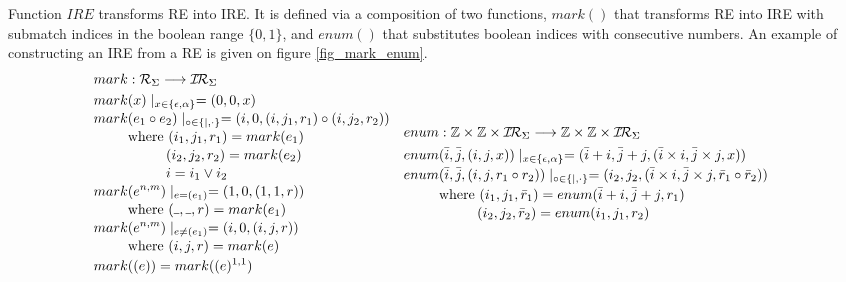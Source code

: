 \documentclass[AMA,STIX1COL]{WileyNJD-v2}
\newcommand{\Xund}{\rule{.4em}{.4pt}}
\newcommand{\XI}{\mathcal{I}}
\newcommand{\XIR}{\XI\!\XR}
\newcommand{\XR}{\mathcal{R}}
\newcommand{\YZ}{\mathbb{Z}}
\newcommand{\IRE}{I\!RE}
\begin{document}
Function $\IRE$ transforms RE into IRE.
It is defined via a composition of two functions,
$mark()$ that transforms RE into IRE with submatch indices in the boolean range $\{0, 1\}$,
and $enum()$ that substitutes boolean indices with consecutive numbers.
An example of constructing an IRE from a RE is given on figure \ref{fig_mark_enum}.
%
    \begin{align*}
    &\begin{aligned}
        mark &: \XR_\Sigma \longrightarrow \XIR_\Sigma \\
        mark &(x) \mid_{x \in \{\epsilon, \alpha\}} = (0, 0, x) \\[-0.2em]
        mark &(e_1 \circ e_2) \mid_{\circ \in \{|,\cdot\}} = (i, 0,
            (i, j_1, r_1) \circ
            (i, j_2, r_2)
            ) \\[-0.2em]
            &\text{where }            (i_1, j_1, r_1) = mark(e_1) \\[-0.2em]
            &\space{\hphantom{where }}(i_2, j_2, r_2) = mark(e_2) \\[-0.2em]
            &\space{\hphantom{where }}i = i_1 \vee i_2 \\[-0.2em]
        mark &(e^{n, m}) \mid_{e = (e_1)} = (1, 0, (1, 1, r)) \\[-0.2em]
            &\text{where } (\Xund, \Xund, r) = mark(e_1) \\[-0.2em]
        mark &(e^{n, m}) \mid_{e \neq (e_1)} = (i, 0, (i, j, r)) \\[-0.2em]
            &\text{where } (i, j, r) = mark(e) \\[-0.2em]
        mark &((e)) = mark((e)^{1, 1})
    \end{aligned}
    &&\begin{aligned}
        enum &: \YZ \times \YZ \times \XIR_\Sigma \longrightarrow \YZ \times \YZ \times \XIR_\Sigma \\
        enum &(\bar{i}, \bar{j}, (i, j, x)) \mid_{x \in \{\epsilon, \alpha\}}
            = (\bar{i} + i, \bar{j} + j, (\bar{i} \times i, \bar{j} \times j, x))
        \\[-0.2em]
        enum &(\bar{i}, \bar{j}, (i, j, r_1 \circ r_2)) \mid_{\circ \in \{|,\cdot\}}
            = (i_2, j_2, (\bar{i} \times i, \bar{j} \times j, \bar{r}_1 \circ \bar{r}_2)) \\[-0.2em]
            &\text{where }            (i_1, j_1, \bar{r}_1) = enum(\bar{i} + i, \bar{j} + j, r_1) \\[-0.2em]
            &\space{\hphantom{where }}(i_2, j_2, \bar{r}_2) = enum(i_1, j_1, r_2)

\end{aligned}
\end{align*}
\end{document}

